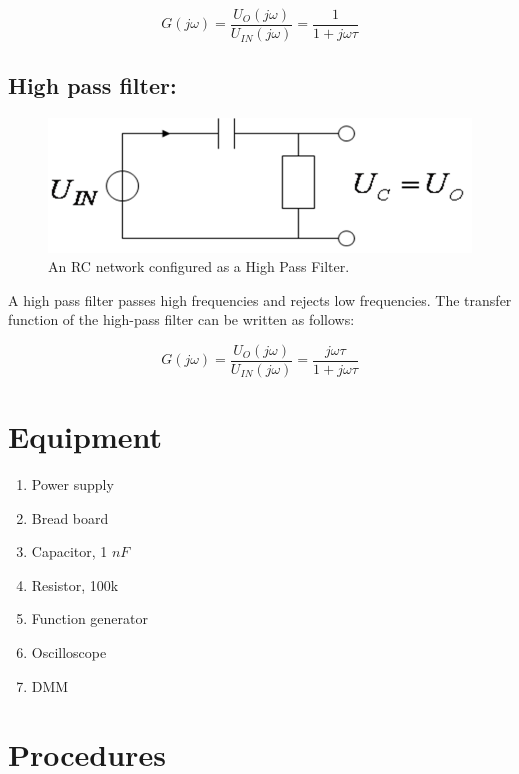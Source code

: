 \documentclass[11pt,letterpaper]{article}
\begin{document}
\begin{equation} \label{Eqn:PassiveFilters1}
G(j \omega) = \dfrac{U_O (j \omega)}{U_{IN} (j \omega)} = \dfrac{1}{1 + j \omega \tau}
\end{equation}

\subsection{High pass filter:}

\begin{figure}
\centering
\includegraphics[width=0.7\linewidth]{Lab4_HighPassFilter}
\caption{An RC network configured as a High Pass Filter.}
\label{fig:Lab4_HighPassFilter}
\end{figure}

A high pass filter passes high frequencies and rejects low frequencies. The transfer function of the high-pass filter can be written as follows:

\begin{equation} \label{Eqn:PassiveFilters2}
G(j \omega) = \dfrac{U_O (j \omega)}{U_{IN} (j \omega)} = \dfrac{j \omega \tau}{1 + j \omega \tau}
\end{equation}
	
\section{Equipment}
	
\begin{enumerate}
\item Power supply
\item Bread board
\item Capacitor, 1 $nF$
\item Resistor, 100k
\item Function generator
\item Oscilloscope
\item DMM
\end{enumerate}
	 	
\section{Procedures}	 
\end{document}
